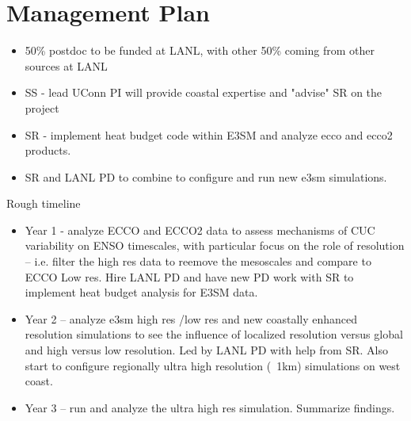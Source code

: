 \section{Management Plan}


\begin{itemize}

    \item 50\% postdoc to be funded at LANL, with other 50\% coming from other sources at LANL
    \item SS - lead UConn PI will provide coastal expertise and "advise" SR on the project
    \item SR - implement heat budget code within E3SM and analyze ecco and ecco2 products.
    \item SR and LANL PD to combine to configure and run new e3sm simulations.
\end{itemize}

Rough timeline
\begin{itemize}
    \item Year 1 - analyze ECCO and ECCO2 data to assess mechanisms of CUC variability on ENSO timescales, with particular focus on the role of resolution -- i.e. filter the high res data to reemove the mesoscales and compare to ECCO Low res.  Hire LANL PD and have new PD work with SR to implement heat budget analysis for E3SM data.
    \item Year 2 -- analyze e3sm high res /low res and new coastally enhanced resolution simulations to see the influence of localized resolution versus global and high versus low resolution.  Led by LANL PD with help from SR.   Also start to configure regionally ultra high resolution (~1km) simulations on west coast.
    \item Year 3 -- run and analyze the ultra high res simulation.  Summarize findings.
\end{itemize}
